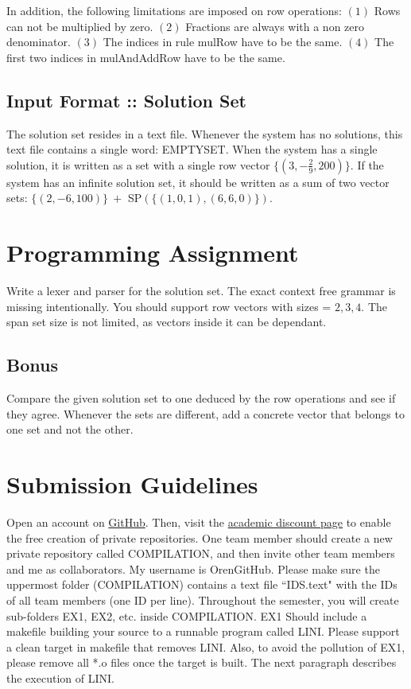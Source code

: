 \documentclass{article}
\begin{document}
In addition, the following limitations are imposed on row operations:
$(1)$ Rows can not be multiplied by zero.
$(2)$ Fractions are always with a non zero denominator.
$(3)$ The indices in rule mulRow have to be the same.
$(4)$ The first two indices in mulAndAddRow have to be the same.

\subsection*{Input Format :: Solution Set}
The solution set resides in a text file.
Whenever the system has no solutions, this text file contains a single word:
EMPTYSET. When the system has a single solution, it is written as a set 
with a single row vector $\{(3,-\frac{2}{9},200)\}$. If the system has an infinite
solution set, it should be written as a sum of two vector sets:
$\{(2,-6,100)\} ~ +$ SP$(\{(1,0,1), (6,6,0)\})$.

\section{Programming Assignment}
Write a lexer and parser for the solution set.
The exact context free grammar is missing intentionally.
You should support row vectors with sizes = $2,3,4$.
The span set size is not limited, as vectors inside it can be dependant.

\subsection*{Bonus}
Compare the given solution set to one deduced by the row operations
and see if they agree. Whenever the sets are different,
add a concrete vector that belongs to one set and not the other.

\section{Submission Guidelines}
Open an account on \href{https://github.com/}{GitHub}.
Then, visit the
\href{https://education.github.com/discount_requests/new}{academic discount page}
to enable the free creation of private repositories.
One team member should create a new private repository called COMPILATION,
and then invite other team members and me as collaborators.
My username is OrenGitHub.
Please make sure the uppermost folder (COMPILATION) contains a text file ``IDS.text" with the IDs of all team members (one ID per line).
Throughout the semester, you will create sub-folders EX1, EX2, etc. inside COMPILATION.
EX1 Should include a makefile building your source to a runnable
program called LINI.
Please support a clean target in makefile that removes LINI.
Also, to avoid the pollution of EX1,
please remove all *.o files once the target is built.
The next paragraph describes the execution of LINI.
\end{document}
